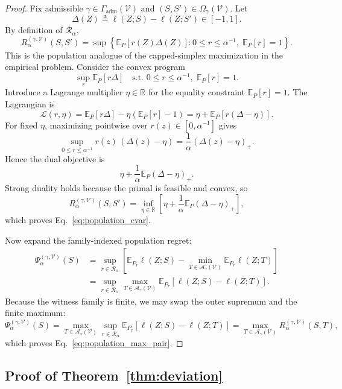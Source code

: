 \documentclass{article}
\newcommand{\RR}{\mathbb{R}}
\newcommand{\EE}{\mathbb{E}}
\newcommand{\cA}{\mathcal{A}}
\newcommand{\cR}{\mathcal{R}}
\newcommand{\cV}{\mathcal{V}}
\newcommand{\braces}[1]{\left\{ #1 \right\}}
\newcommand{\bracks}[1]{\left[ #1 \right]}
\newcommand{\loss}{\ell}
\newcommand{\1}{\mathbbm{1}}
\begin{document}
\begin{proof}
Fix admissible \(\gamma\in\Gamma_{\mathrm{adm}}(\cV)\) and \((S,S')\in\Omega_\gamma(\cV)\). Let
\[
    \Delta(Z)
    \triangleq
    \loss(Z;S)-\loss(Z;S') \in [-1,1].
\]
By definition of \(\cR_\alpha\),
\[
    R^{(\gamma,\cV)}_\alpha(S,S')
    =
    \sup\braces{
        \EE_P[r(Z)\Delta(Z)] :
        0\le r\le \alpha^{-1},\;
        \EE_P[r]=1
    }.
\]
This is the population analogue of the capped-simplex maximization in the empirical problem. Consider the convex program
\[
    \sup_r \EE_P[r\Delta]
    \quad
    \text{s.t. }
    0\le r\le \alpha^{-1},
    \;
    \EE_P[r]=1.
\]
Introduce a Lagrange multiplier \(\eta\in\RR\) for the equality constraint \(\EE_P[r]=1\). The Lagrangian is
\[
    \mathcal L(r,\eta)
    =
    \EE_P[r\Delta] - \eta(\EE_P[r]-1)
    =
    \eta + \EE_P\!\left[r(\Delta-\eta)\right].
\]
For fixed \(\eta\), maximizing pointwise over \(r(z)\in[0,\alpha^{-1}]\) gives
\[
    \sup_{0\le r\le \alpha^{-1}} r(z)\,(\Delta(z)-\eta)
    =
    \frac{1}{\alpha}(\Delta(z)-\eta)_+.
\]
Hence the dual objective is
\[
    \eta + \frac{1}{\alpha}\EE_P(\Delta-\eta)_+.
\]
Strong duality holds because the primal is feasible and convex, so
\[
    R^{(\gamma,\cV)}_\alpha(S,S')
    =
    \inf_{\eta\in\RR}
    \bracks{
        \eta + \frac{1}{\alpha}\EE_P(\Delta-\eta)_+
    },
\]
which proves Eq.~\eqref{eq:population_cvar}.

Now expand the family-indexed population regret:
\begin{align*}
    \Psi^{(\gamma,\cV)}_\alpha(S)
    &=
    \sup_{r\in\cR_\alpha}
    \left[
        \EE_{P_r}\loss(Z;S)
        -
        \min_{T\in\cA_\gamma(\cV)} \EE_{P_r}\loss(Z;T)
    \right]
    \\
    &=
    \sup_{r\in\cR_\alpha}
    \max_{T\in\cA_\gamma(\cV)}
    \EE_{P_r}\!\left[\loss(Z;S)-\loss(Z;T)\right].
\end{align*}
Because the witness family is finite, we may swap the outer supremum and the finite maximum:
\[
    \Psi^{(\gamma,\cV)}_\alpha(S)
    =
    \max_{T\in\cA_\gamma(\cV)}
    \sup_{r\in\cR_\alpha}
    \EE_{P_r}\!\left[\loss(Z;S)-\loss(Z;T)\right]
    =
    \max_{T\in\cA_\gamma(\cV)}
    R^{(\gamma,\cV)}_\alpha(S,T),
\]
which proves Eq.~\eqref{eq:population_max_pair}.
\end{proof}

\subsection{Proof of Theorem~\ref{thm:deviation}}
\end{document}

